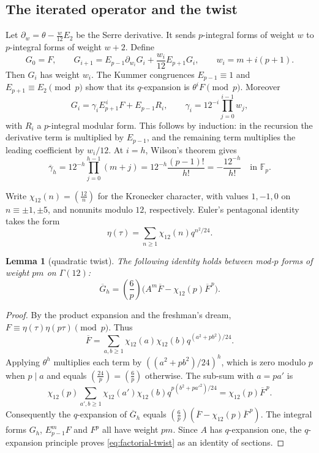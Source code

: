 \documentclass[11pt,a4paper]{article}
\numberwithin{equation}{section}
\newtheorem{lemma}[theorem]{Lemma}
\theoremstyle{definition}
\theoremstyle{remark}
\newcommand{\Fp}{\mathbb F_p}
\newcommand{\leg}[2]{\left(\frac{#1}{#2}\right)}
\newcommand{\Lp}[1]{\left(\frac{#1}{p}\right)}
\begin{document}
\subsection{The iterated operator and the twist}
Let $\partial_w=\theta-\frac{w}{12}E_2$ be the Serre derivative.
It sends $p$-integral forms of weight $w$ to $p$-integral forms of
weight $w+2$. Define
\[
G_0=F,\qquad
G_{i+1}=E_{p-1}\partial_{w_i}G_i+\frac{w_i}{12}E_{p+1}G_i,
\qquad w_i=m+i(p+1).
\]
Then $G_i$ has weight $w_i$. The Kummer congruences
$E_{p-1}\equiv1$ and $E_{p+1}\equiv E_2\pmod p$ show that its
$q$-expansion is $\theta^iF\pmod p$. Moreover
\begin{equation}\label{eq:factorial-leading}
G_i=\gamma_i E_{p+1}^{\,i}F+E_{p-1}R_i,\qquad
\gamma_i=12^{-i}\prod_{j=0}^{i-1}w_j,
\end{equation}
with $R_i$ a $p$-integral modular form. This follows by induction: in the
recursion the derivative term is multiplied by $E_{p-1}$, and the
remaining term multiplies the leading coefficient by $w_i/12$.
At $i=h$, Wilson's theorem gives
\begin{equation}\label{eq:factorial-gamma}
\overline\gamma_h
=12^{-h}\prod_{j=0}^{h-1}(m+j)
=12^{-h}\frac{(p-1)!}{h!}
=-\frac{12^{-h}}{h!}\quad\text{in }\Fp.
\end{equation}

Write $\chi_{12}(n)=\leg{12}{n}$ for the Kronecker character, with
values $1,-1,0$ on $n\equiv\pm1,\pm5$, and nonunits modulo $12$,
respectively. Euler's pentagonal identity \citep{Apostol90} takes the form
\[
\eta(\tau)=\sum_{n\ge1}\chi_{12}(n)q^{n^2/24}.
\]
\begin{lemma}[quadratic twist]\label{lem:factorial-twist}
The following identity holds between mod-$p$ forms of weight $pm$ on
$\Gamma(12)$:
\begin{equation}\label{eq:factorial-twist}
\overline G_h=\Lp6\bigl(A^m\overline F-\chi_{12}(p)\overline F^{\,p}\bigr).
\end{equation}
\end{lemma}
\begin{proof}
By the product expansion and the freshman's dream,
$F\equiv\eta(\tau)\eta(p\tau)\pmod p$. Thus
\[
\overline F=\sum_{a,b\ge1}\chi_{12}(a)\chi_{12}(b)
q^{(a^2+pb^2)/24}.
\]
Applying $\theta^h$ multiplies each term by
$((a^2+pb^2)/24)^h$, which is zero modulo $p$ when $p\mid a$
and equals $\leg{24}{p}=\Lp6$ otherwise.
The sub-sum with $a=pa'$ is
\[
\chi_{12}(p)\sum_{a',b\ge1}\chi_{12}(a')\chi_{12}(b)
q^{p(b^2+pa'^2)/24}
=\chi_{12}(p)\overline F^{\,p}.
\]
Consequently the $q$-expansion of $\overline G_h$ equals
$\Lp6(\overline F-\chi_{12}(p)\overline F^{\,p})$.
The integral forms $G_h$, $E_{p-1}^mF$ and $F^p$ all have weight
$pm$. Since $A$ has $q$-expansion one, the $q$-expansion principle
proves \eqref{eq:factorial-twist} as an identity of sections.
\end{proof}
\end{document}
